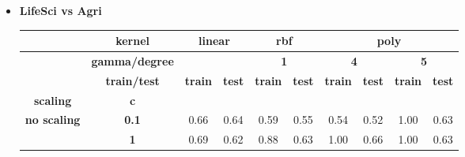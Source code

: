 \documentclass{article}
\theoremstyle{mytheoremstyle}
\theoremstyle{mytheoremstyle}
\theoremstyle{myproblemstyle}
\begin{document}
\begin{itemize}
  \item \textbf{LifeSci vs Agri}
        \begin{longtable}{cccc|cc|cccc}
          \cline{2-10}
          \textbf{}                                                                            & \textbf{kernel}       & \multicolumn{2}{c|}{\textbf{linear}} & \multicolumn{2}{c|}{\textbf{rbf}} & \multicolumn{4}{c}{\textbf{poly}}                                                                                                                \\ \cline{2-10}
          \endfirsthead
          \endhead
          \textbf{}                                                                            & \textbf{gamma/degree} & \multicolumn{2}{c|}{\textbf{}}       & \multicolumn{2}{c|}{\textbf{1}}   & \multicolumn{2}{c}{\textbf{4}}    & \multicolumn{2}{c}{\textbf{5}}                                                                               \\ \cline{2-10}
          \textbf{}                                                                            & \textbf{train/test}   & \textbf{train}                       & \textbf{test}                     & \textbf{train}                    & \textbf{test}                  & \textbf{train} & \textbf{test}             & \textbf{train} & \textbf{test} \\ \cline{2-10}
          \textbf{scaling}                                                                     & \textbf{c}            & \textbf{}                            & \textbf{}                         & \textbf{}                         & \textbf{}                      & \textbf{}      & \textbf{}                 & \textbf{}      & \textbf{}     \\ \hline
          \multirow{3}{*}{\textbf{no scaling}}                                                 & \textbf{0.1}          & 0.66                                 & 0.64                              & 0.59                              & 0.55                           & 0.54           & 0.52                      & 1.00           & 0.63          \\ \cline{7-8}
                                                                                               & \textbf{1}            & 0.69                                 & 0.62                              & 0.88                              & 0.63                           & 1.00           & \multicolumn{1}{c|}{0.66} & 1.00           & 0.63          \\ \cline{7-8}

\end{longtable}
\end{itemize}
\end{document}
